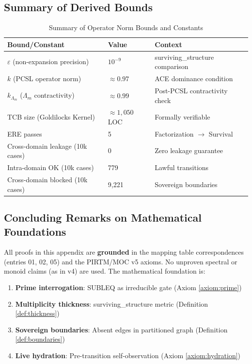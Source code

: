 \documentclass[11pt,a4paper]{article}
\begin{document}
\subsection{Summary of Derived Bounds}

\begin{table}[h]
\centering
\caption{Summary of Operator Norm Bounds and Constants}
\label{tab:bounds_summary}
\begin{tabular}{@{}l l l@{}}
\toprule
\textbf{Bound/Constant} & \textbf{Value} & \textbf{Context} \\
\midrule
$\varepsilon$ (non-expansion precision) & $10^{-9}$ & surviving\_structure comparison \\
$k$ (PCSL operator norm) & $\approx 0.97$ & ACE dominance condition \\
$k_{\Lambda_m}$ ($\Lambda_m$ contractivity) & $\approx 0.99$ & Post-PCSL contractivity check \\
TCB size (Goldilocks Kernel) & $\approx 1,050$ LOC & Formally verifiable \\
ERE passes & 5 & Factorization $\to$ Survival \\
Cross-domain leakage (10k cases) & 0 & Zero leakage guarantee \\
Intra-domain OK (10k cases) & 779 & Lawful transitions \\
Cross-domain blocked (10k cases) & 9,221 & Sovereign boundaries \\
\bottomrule
\end{tabular}
\end{table}

\subsection{Concluding Remarks on Mathematical Foundations}

All proofs in this appendix are \textbf{grounded} in the mapping table correspondences (entries 01, 02, 05) and the PIRTM/MOC v5 axioms. No unproven spectral or monoid claims (as in v4) are used. The mathematical foundation is:

\begin{enumerate}
    \item \textbf{Prime interrogation}: SUBLEQ as irreducible gate (Axiom \ref{axiom:prime})
    \item \textbf{Multiplicity thickness}: surviving\_structure metric (Definition \ref{def:thickness})
    \item \textbf{Sovereign boundaries}: Absent edges in partitioned graph (Definition \ref{def:boundaries})
    \item \textbf{Live hydration}: Pre-transition self-observation (Axiom \ref{axiom:hydration})
\end{enumerate}
\end{document}
